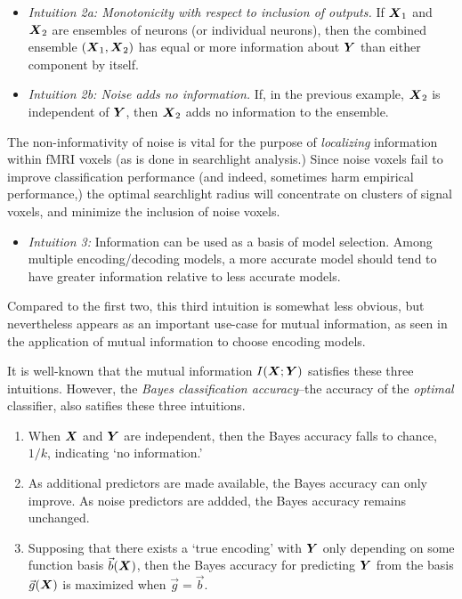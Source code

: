 \begin{itemize}
\item \emph{
Intuition 2a: Monotonicity with respect to inclusion of outputs.} If $\boldsymbol{X}_1$ and $\boldsymbol{X}_2$ are ensembles of neurons (or
individual neurons), then the combined ensemble $(\boldsymbol{X}_1, \boldsymbol{X}_2)$ has equal or
more information about $\boldsymbol{Y}$ than either component by itself.
\end{itemize}

\begin{itemize}
\item \emph{
Intuition 2b: Noise adds no information.} If, in the previous example, $\boldsymbol{X}_2$ is independent of
$\boldsymbol{Y}$, then $\boldsymbol{X}_2$ adds no information to the ensemble.
\end{itemize}
The non-informativity of noise is vital for the purpose of
\emph{localizing} information within fMRI voxels (as is done in
searchlight analysis.)  Since noise voxels fail to improve
classification performance (and indeed, sometimes harm empirical
performance,) the optimal searchlight radius will concentrate on
clusters of signal voxels, and minimize the inclusion of noise voxels.

\begin{itemize}
\item \emph{Intuition 3:}
Information can be used as a basis of model selection.  Among multiple
encoding/decoding models, a more accurate model should tend to have
greater information relative to less accurate models.  
\end{itemize}
Compared to the first two, this third intuition is somewhat less
obvious, but nevertheless appears as an important use-case for mutual
information, as seen in the application of mutual information to
choose encoding models.


It is well-known that the mutual information $I(\boldsymbol{X}; \boldsymbol{Y})$ satisfies
these three intuitions.  However, the \emph{Bayes classification
  accuracy}--the accuracy of the \emph{optimal} classifier, also
satifies these three intuitions.  
\begin{enumerate}
\item When $\boldsymbol{X}$ and $\boldsymbol{Y}$ are
independent, then the Bayes accuracy falls to chance, $1/k$,
indicating `no information.'  
\item As additional predictors are made available, the Bayes accuracy
  can only improve.  As noise predictors are addded, the Bayes
  accuracy remains unchanged.
\item Supposing that there exists a `true encoding' with $\boldsymbol{Y}$ only
  depending on some function basis $\vec{b}(\boldsymbol{X})$, then the Bayes
  accuracy for predicting $\boldsymbol{Y}$ from the basis $\vec{g}(\boldsymbol{X})$ is
  maximized when $\vec{g} = \vec{b}$.
\end{enumerate}

